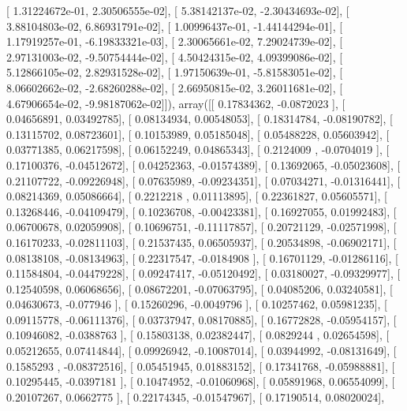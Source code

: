 \documentclass{article}
\begin{document}
       [  1.31224672e-01,   2.30506555e-02],
       [  5.38142137e-02,  -2.30434693e-02],
       [  3.88104803e-02,   6.86931791e-02],
       [  1.00996437e-01,  -1.44144294e-01],
       [  1.17919257e-01,  -6.19833321e-03],
       [  2.30065661e-02,   7.29024739e-02],
       [  2.97131003e-02,  -9.50754444e-02],
       [  4.50424315e-02,   4.09399086e-02],
       [  5.12866105e-02,   2.82931528e-02],
       [  1.97150639e-01,  -5.81583051e-02],
       [  8.06602662e-02,  -2.68260288e-02],
       [  2.66950815e-02,   3.26011681e-02],
       [  4.67906654e-02,  -9.98187062e-02]]), array([[ 0.17834362, -0.0872023 ],
       [ 0.04656891,  0.03492785],
       [ 0.08134934,  0.00548053],
       [ 0.18314784, -0.08190782],
       [ 0.13115702,  0.08723601],
       [ 0.10153989,  0.05185048],
       [ 0.05488228,  0.05603942],
       [ 0.03771385,  0.06217598],
       [ 0.06152249,  0.04865343],
       [ 0.2124009 , -0.0704019 ],
       [ 0.17100376, -0.04512672],
       [ 0.04252363, -0.01574389],
       [ 0.13692065, -0.05023608],
       [ 0.21107722, -0.09226948],
       [ 0.07635989, -0.09234351],
       [ 0.07034271, -0.01316441],
       [ 0.08214369,  0.05086664],
       [ 0.2212218 ,  0.01113895],
       [ 0.22361827,  0.05605571],
       [ 0.13268446, -0.04109479],
       [ 0.10236708, -0.00423381],
       [ 0.16927055,  0.01992483],
       [ 0.06700678,  0.02059908],
       [ 0.10696751, -0.11117857],
       [ 0.20721129, -0.02571998],
       [ 0.16170233, -0.02811103],
       [ 0.21537435,  0.06505937],
       [ 0.20534898, -0.06902171],
       [ 0.08138108, -0.08134963],
       [ 0.22317547, -0.0184908 ],
       [ 0.16701129, -0.01286116],
       [ 0.11584804, -0.04479228],
       [ 0.09247417, -0.05120492],
       [ 0.03180027, -0.09329977],
       [ 0.12540598,  0.06068656],
       [ 0.08672201, -0.07063795],
       [ 0.04085206,  0.03240581],
       [ 0.04630673, -0.077946  ],
       [ 0.15260296, -0.0049796 ],
       [ 0.10257462,  0.05981235],
       [ 0.09115778, -0.06111376],
       [ 0.03737947,  0.08170885],
       [ 0.16772828, -0.05954157],
       [ 0.10946082, -0.0388763 ],
       [ 0.15803138,  0.02382447],
       [ 0.0829244 ,  0.02654598],
       [ 0.05212655,  0.07414844],
       [ 0.09926942, -0.10087014],
       [ 0.03944992, -0.08131649],
       [ 0.1585293 , -0.08372516],
       [ 0.05451945,  0.01883152],
       [ 0.17341768, -0.05988881],
       [ 0.10295445, -0.0397181 ],
       [ 0.10474952, -0.01060968],
       [ 0.05891968,  0.06554099],
       [ 0.20107267,  0.0662775 ],
       [ 0.22174345, -0.01547967],
       [ 0.17190514,  0.08020024],
\end{document}
